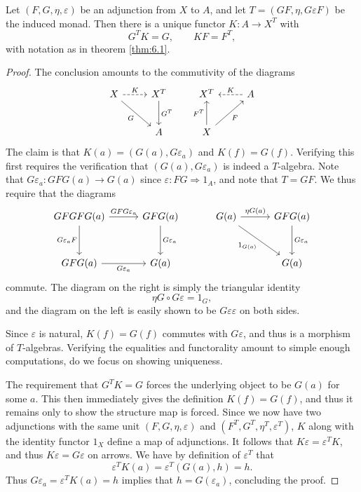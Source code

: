 \begin{theorem}\label{thm:6.2}
	Let $(F,G,\eta,\varepsilon )$ be an adjunction from $X$ to $A$, and let $T=(GF,\eta,G\varepsilon F)$ be the induced monad. Then there is a unique functor $K : A \to X^T$ with
	\[
		G^TK=G,\qquad KF=F^T
	,\]
	with notation as in theorem \ref{thm:6.1}.
\end{theorem}
\begin{proof}
	The conclusion amounts to the commutivity of the diagrams
	\[\begin{tikzcd}[row sep = 2.5em, column sep = 2.5em]
	X\ar[" G "', dr] \ar[" K ", dashed, r]  & X^T \ar[" G^T ", d]  & X^T & A\ar[" K "', dashed, l]  \\
	 & A & X \ar[" F^T ", u] \ar[" F "', ur]  & 
	\end{tikzcd}\]
	The claim is that $K(a)=(G(a),G\varepsilon _a)$ and $K(f)=G(f)$. Verifying this first requires the verification that $(G(a),G\varepsilon _a)$ is indeed a $T$-algebra. Note that $G\varepsilon _a : GFG(a) \to G(a)$ since $\varepsilon : FG \Rightarrow 1_A$, and note that $T=GF$. We thus require that the diagrams
	\[\begin{tikzcd}[row sep = 3em, column sep = 3em]
	GFGFG(a)\ar[" GFG\varepsilon _a ", r] \ar[" G\varepsilon _aF "', d]  & GFG(a)\ar[" G\varepsilon _a ", d]  & G(a)\ar[" \eta G(a) ", r] \ar[" 1_{G(a)}  "', dr]  & GFG(a)\ar[" G\varepsilon _a ", d]  \\
	GFG(a)\ar[" G\varepsilon _a "', r]  & G(a) &  & G(a)
	\end{tikzcd}\]
	commute. The diagram on the right is simply the triangular identity
	\[
		\eta G \circ G\varepsilon =1_G,
	\]
	and the diagram on the left is easily shown to be $G\varepsilon \varepsilon $ on both sides.

	Since $\varepsilon $ is natural, $K(f)=G(f)$ commutes with $G\varepsilon $, and thus is a morphism of $T$-algebras. Verifying the equalities and functorality amount to simple enough computations, do we focus on showing uniqueness.

	The requirement that $G^TK=G$ forces the underlying object to be $G(a)$ for some $a$. This then immediately gives the definition $K(f)=G(f)$, and thus it remains only to show the structure map is forced. Since we now have two adjunctions with the same unit $(F,G,\eta,\varepsilon )$ and $(F^T,G^T,\eta^T,\varepsilon ^T)$, $K$ along with the identity functor $1_X$ define a map of adjunctions. It follows that $K\varepsilon =\varepsilon ^TK$, and thus $K\varepsilon =G\varepsilon $ on arrows. We have by definition of $\varepsilon ^T$ that
	\[
		\varepsilon ^TK(a)=\varepsilon ^T(G(a),h)=h
	.\]
	Thus $G\varepsilon _a=\varepsilon ^TK(a)=h$ implies that $h=G(\varepsilon _a)$, concluding the proof.
\end{proof}

